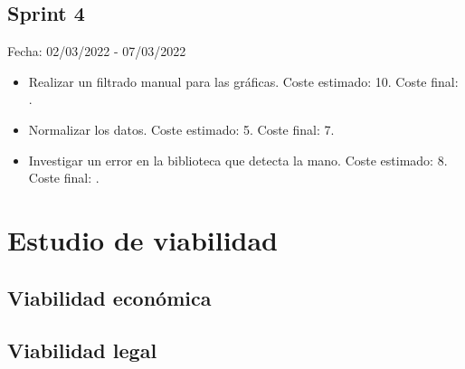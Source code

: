\subsection{Sprint 4}
Fecha: 02/03/2022 - 07/03/2022
\begin{itemize}
	\item Realizar un filtrado manual para las gráficas. Coste estimado: 10. Coste final: . 
	\item Normalizar los datos. Coste estimado: 5. Coste final: 7.
	\item Investigar un error en la biblioteca que detecta la mano. Coste estimado: 8. Coste final: .
\end{itemize}

\section{Estudio de viabilidad}

\subsection{Viabilidad económica}

\subsection{Viabilidad legal}
